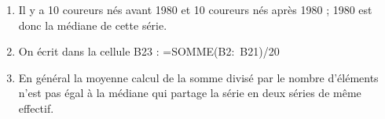 %
%
%
\begin{enumerate}
\item %
%
%
Il y a 10 coureurs nés avant 1980 et 10 coureurs nés après 1980 ; 1980 est donc la médiane de cette série.
\item %

On écrit dans la cellule B23 : =SOMME(B2:~B21)/20
\item %

En général la moyenne calcul de la somme divisé par le nombre d'éléments n'est pas égal à la médiane qui partage la série en deux séries de même effectif.
\end{enumerate}
